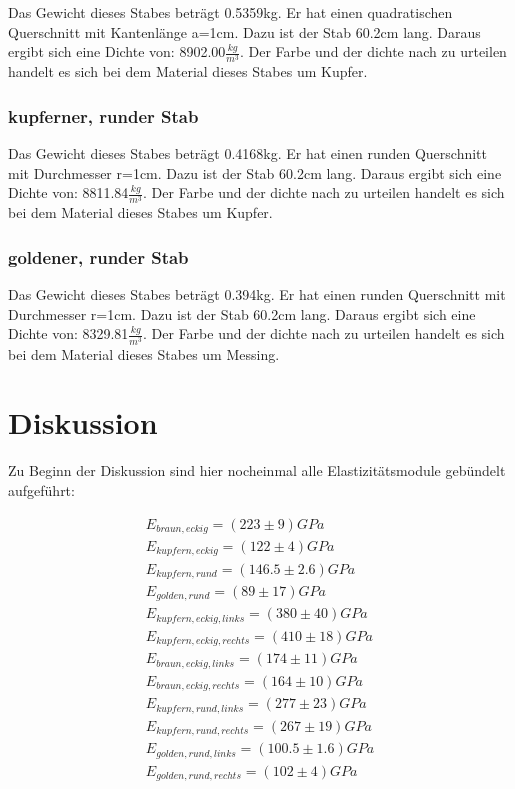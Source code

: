 Das Gewicht dieses Stabes beträgt 0.5359kg. Er hat einen quadratischen Querschnitt mit Kantenlänge a=1cm. Dazu ist der Stab 60.2cm lang. Daraus ergibt sich eine Dichte von: 8902.00$\frac{kg}{m^3}$.
Der Farbe und der dichte nach zu urteilen handelt es sich bei dem Material dieses Stabes um Kupfer.

\subsubsection{kupferner, runder Stab}

Das Gewicht dieses Stabes beträgt 0.4168kg. Er hat einen runden Querschnitt mit Durchmesser r=1cm. Dazu ist der Stab 60.2cm lang. Daraus ergibt sich eine Dichte von: 8811.84$\frac{kg}{m^3}$.
Der Farbe und der dichte nach zu urteilen handelt es sich bei dem Material dieses Stabes um Kupfer.

\subsubsection{goldener, runder Stab}

Das Gewicht dieses Stabes beträgt 0.394kg. Er hat einen runden Querschnitt mit Durchmesser r=1cm. Dazu ist der Stab 60.2cm lang. Daraus ergibt sich eine Dichte von: 8329.81$\frac{kg}{m^3}$.
Der Farbe und der dichte nach zu urteilen handelt es sich bei dem Material dieses Stabes um Messing.

\section{Diskussion}

Zu Beginn der Diskussion sind hier nocheinmal alle Elastizitätsmodule gebündelt aufgeführt:

\begin{align*}
    E_{braun, eckig} = (223\pm 9) GPa \\
    E_{kupfern, eckig} = (122\pm 4) GPa \\
    E_{kupfern, rund} = (146.5\pm 2.6) GPa \\
    E_{golden, rund} = (89\pm 17) GPa \\
    E_{kupfern, eckig, links} = (380\pm 40)GPa\\
    E_{kupfern, eckig, rechts} = (410\pm 18)GPa\\
    E_{braun, eckig, links} = (174\pm 11)GPa\\
    E_{braun, eckig, rechts} = (164\pm 10)GPa\\
    E_{kupfern, rund, links} = (277\pm 23)GPa\\
    E_{kupfern, rund, rechts} = (267\pm 19)GPa\\
    E_{golden, rund, links} = (100.5\pm 1.6)GPa\\
    E_{golden, rund, rechts} = (102\pm 4)GPa\\
\end{align*}

